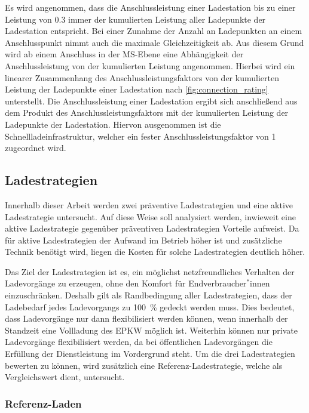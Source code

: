 

Es wird angenommen, dass die Anschlussleistung einer Ladestation bis zu einer Leistung von \SI{0.3}{\mva} immer der kumulierten Leistung aller Ladepunkte der Ladestation entspricht.
Bei einer Zunahme der Anzahl an Ladepunkten an einem Anschlusspunkt nimmt auch die maximale Gleichzeitigkeit ab.
Aus diesem Grund wird ab einem Anschluss in der \gls{MS}-Ebene eine Abhängigkeit der Anschlussleistung von der kumulierten Leistung angenommen.
Hierbei wird ein linearer Zusammenhang des Anschlussleistungsfaktors von der kumulierten Leistung der Ladepunkte einer Ladestation nach \autoref{fig:connection_rating} unterstellt.
Die Anschlussleistung einer Ladestation ergibt sich anschließend aus dem Produkt des Anschlussleistungsfaktors mit der kumulierten Leistung der Ladepunkte der Ladestation.
Hiervon ausgenommen ist die Schnellladeinfrastruktur, welcher ein fester Anschlussleistungsfaktor von \num{1} zugeordnet wird.


\subsection{Ladestrategien}\label{chap:theo_strategies}

Innerhalb dieser Arbeit werden zwei präventive Ladestrategien und eine aktive Ladestrategie untersucht.
Auf diese Weise soll analysiert werden, inwieweit eine aktive Ladestrategie gegenüber präventiven Ladestrategien Vorteile aufweist.
Da für aktive Ladestrategien der Aufwand im Betrieb höher ist und zusätzliche Technik benötigt wird, liegen die Kosten für solche Ladestrategien deutlich höher.\medskip

Das Ziel der Ladestrategien ist es, ein möglichst netzfreundliches Verhalten der Ladevorgänge zu erzeugen, ohne den Komfort für Endverbraucher$^*$innen einzuschränken.
Deshalb gilt als Randbedingung aller Ladestrategien, dass der Ladebedarf jedes Ladevorgangs zu \SI{100}{\percent} gedeckt werden muss.
Dies bedeutet, dass Ladevorgänge nur dann flexibilisiert werden können, wenn innerhalb der Standzeit eine Vollladung des \gls{EPKW} möglich ist.
Weiterhin können nur private Ladevorgänge flexibilisiert werden, da bei öffentlichen Ladevorgängen die Erfüllung der Dienstleistung im Vordergrund steht.
Um die drei Ladestrategien bewerten zu können, wird zusätzlich eine Referenz-Ladestrategie, welche als Vergleichswert dient, untersucht.


\subsubsection{Referenz-Laden}

